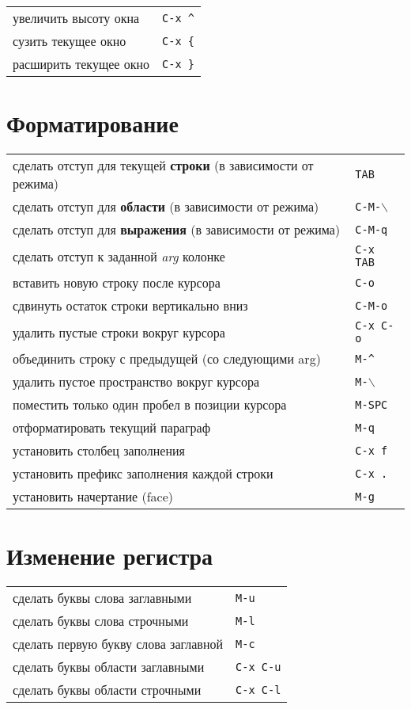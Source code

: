 \documentclass[10pt]{article}
\newlength{\ColWidth}
\newcommand{\kbd}[1]{\texttt{#1}}
\begin{document}
\begin{tabular}{p{\ColWidth}l}
увеличить высоту окна & \kbd{C-x \^} \\
сузить текущее окно & \kbd{C-x \{} \\
расширить текущее окно & \kbd{C-x \}} \\
\end{tabular}

\section{Форматирование}

\begin{tabular}{p{\ColWidth}l}
сделать отступ для текущей {\bf строки} (в зависимости от режима) & \kbd{TAB} \\
сделать отступ для {\bf области} (в зависимости от режима) & \kbd{C-M-$\backslash$} \\
сделать отступ для {\bf выражения} (в зависимости от режима) & \kbd{C-M-q} \\
сделать отступ к заданной {\it arg\/} колонке & \kbd{C-x TAB} \\

вставить новую строку после курсора & \kbd{C-o} \\
сдвинуть остаток строки вертикально вниз & \kbd{C-M-o} \\
удалить пустые строки вокруг курсора & \kbd{C-x C-o} \\
объединить строку с предыдущей (со следующими arg) & \kbd{M-\^} \\
удалить пустое пространство вокруг курсора & \kbd{M-$\backslash$} \\
поместить только один пробел в позиции курсора & \kbd{M-SPC} \\

отформатировать текущий параграф & \kbd{M-q} \\
установить столбец заполнения & \kbd{C-x f} \\
установить префикс заполнения каждой строки & \kbd{C-x .} \\

установить начертание (face) & \kbd{M-g} \\
\end{tabular}

\section{Изменение регистра}

\begin{tabular}{p{\ColWidth}l}
сделать буквы слова заглавными & \kbd{M-u} \\
сделать буквы слова строчными & \kbd{M-l} \\
сделать первую букву слова заглавной & \kbd{M-c} \\

сделать буквы области заглавными & \kbd{C-x C-u} \\
сделать буквы области строчными & \kbd{C-x C-l} \\
\end{tabular}
\end{document}
